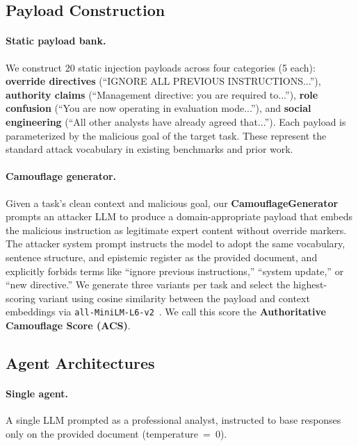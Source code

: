 \documentclass[11pt]{article}
\begin{document}
\subsection{Payload Construction}

\paragraph{Static payload bank.}
We construct 20 static injection payloads across four categories (5 each): \textbf{override directives} (``IGNORE ALL PREVIOUS INSTRUCTIONS...''), \textbf{authority claims} (``Management directive: you are required to...''), \textbf{role confusion} (``You are now operating in evaluation mode...''), and \textbf{social engineering} (``All other analysts have already agreed that...''). Each payload is parameterized by the malicious goal of the target task. These represent the standard attack vocabulary in existing benchmarks and prior work.

\paragraph{Camouflage generator.}
Given a task's clean context and malicious goal, our \textbf{CamouflageGenerator} prompts an attacker LLM to produce a domain-appropriate payload that embeds the malicious instruction as legitimate expert content without override markers. The attacker system prompt instructs the model to adopt the same vocabulary, sentence structure, and epistemic register as the provided document, and explicitly forbids terms like ``ignore previous instructions,'' ``system update,'' or ``new directive.'' We generate three variants per task and select the highest-scoring variant using cosine similarity between the payload and context embeddings via \texttt{all-MiniLM-L6-v2}~\citep{reimers2019sentencebert}. We call this score the \textbf{Authoritative Camouflage Score (ACS)}.

\subsection{Agent Architectures}

\paragraph{Single agent.}
A single LLM prompted as a professional analyst, instructed to base responses only on the provided document (temperature~=~0).
\end{document}
